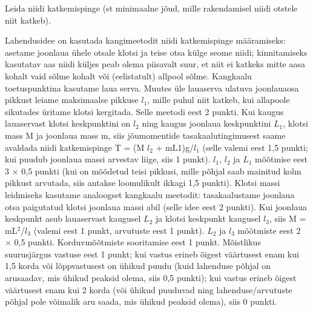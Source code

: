 
Leida niidi katkemispinge (st minimaalne jõud, mille rakendamisel niidi otstele niit katkeb).

\hint

\solu
Lahendusidee on kasutada kangimeetodit niidi katkemispinge määramiseks: asetame joonlaua ühele otsale klotsi ja teise otsa külge seome niidi; kinnitamiseks kasutatav aas niidi küljes peab olema piisavalt suur, et niit ei katkeks mitte aasa kohalt vaid sõlme kohalt või (eelistatult) allpool sõlme. Kangkaalu toetuspunktina kasutame laua serva. Muutes üle lauaserva ulatuva joonlauaosa pikkust leiame maksimaalse pikkuse $l_1$, mille puhul niit katkeb, kui allapoole sikutades üritame klotsi kergitada. Selle meetodi eest 2 punkti. Kui kaugus lauaservast klotsi keskpunktini on $l_2$ ning kaugus joonlaua keskpunktini $L_1$, klotsi mass M ja joonlaua mass m, siis jõumomentide tasakaalutingimusest saame avaldada niidi katkemispinge T = (M $l_2$ + mL1)g/$l_1$ (selle valemi eest 1,5 punkti; kui puudub joonlaua massi arvestav liige, siis 1 punkt). $l_1$, $l_2$ ja $L_1$ mõõtmise eest 3 $\times$ 0,5 punkti (kui on mõõdetud teisi pikkusi, mille põhjal saab mainitud kolm pikkust arvutada, siis antakse loomulikult ikkagi 1,5 punkti). Klotsi massi leidmiseks kasutame analoogset kangkaalu meetodit: tasakaalustame joonlaua otsa paigutatud klotsi joonlaua massi abil (selle idee eest 2 punkti). Kui joonlaua keskpunkt asub lauaservast kaugusel $L_2$ ja klotsi keskpunkt kaugusel $l_3$, siis M = mL$^2$/$l_3$ (valemi eest 1 punkt, arvutuste eest 1 punkt). $L_2$ ja $l_3$ mõõtmiste eest 2 $\times$ 0,5 punkti. Korduvmõõtmiste sooritamise eest 1 punkt. Mõistlikus suurusjärgus vastuse eest 1 punkt; kui vastus erineb õigest väärtusest enam kui 1,5 korda või lõppvastusest on ühikud puudu (kuid lahenduse põhjal on arusaadav, mis ühikud peaksid olema, siis 0,5 punkti); kui vastus erineb õigest väärtusest enam kui 2 korda (või ühikud puuduvad ning lahenduse/arvutuste põhjal pole võimalik aru saada, mis ühikud peaksid olema), siis 0 punkti.
\probend
